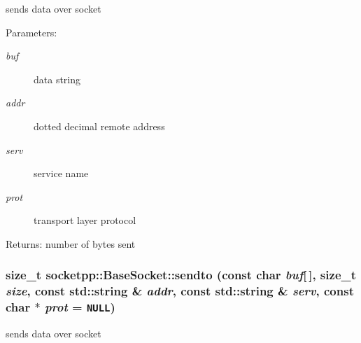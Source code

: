 sends data over socket 

\begin{Desc}
\item[Parameters:]
\begin{description}
\item[{\em buf}]data string \item[{\em addr}]dotted decimal remote address \item[{\em serv}]service name \item[{\em prot}]transport layer protocol \end{description}
\end{Desc}
\begin{Desc}
\item[Returns:]number of bytes sent \end{Desc}
\hypertarget{classsocketpp_1_1BaseSocket_c0bbca9725a55a2e6a822536efd31b73}{
\subsubsection[{sendto}]{\setlength{\rightskip}{0pt plus 5cm}size\_\-t socketpp::BaseSocket::sendto (const char {\em buf}\mbox{[}$\,$\mbox{]}, \/  size\_\-t {\em size}, \/  const std::string \& {\em addr}, \/  const std::string \& {\em serv}, \/  const char $\ast$ {\em prot} = {\tt NULL})}}
\label{classsocketpp_1_1BaseSocket_c0bbca9725a55a2e6a822536efd31b73}


sends data over socket 

